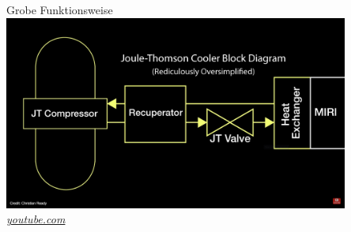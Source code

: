 \documentclass[aspectratio=1610, 9pt, xcolor=dvipsnames]{beamer}
\begin{document}
\begin{frame}{Grobe Funktionsweise}
  \centering
  \includegraphics[width=0.85\textwidth]{Plots/grober_aufbau.png}
  \hspace*{12pt}\hbox{\scriptsize {\footnotesize\itshape \href{https://www.youtube.com/watch?v=FUH61gx149c}
  {youtube.com}}}
\end{frame}
\end{document}
